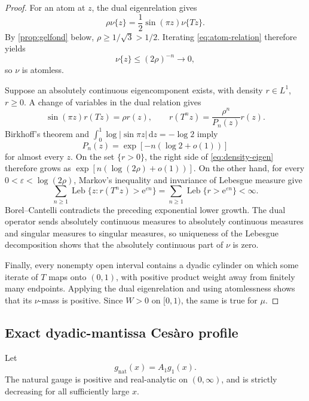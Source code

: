 \documentclass[11pt,oneside]{article}
\theoremstyle{definition}
\theoremstyle{remark}
\newcommand{\e}{\mathrm e}
\newcommand{\dd}{\,\mathrm d}
\newcommand{\T}{T}
\begin{document}
\begin{proof}
For an atom at \(z\), the dual eigenrelation gives
\begin{equation}
 \rho\nu\{z\}=\frac12\sin(\pi z)\nu\{\T z\}.
 \label{eq:atom-relation}
\end{equation}
By \cref{prop:gelfond} below,
\(\rho\ge1/\sqrt3>1/2\).  Iterating
\eqref{eq:atom-relation} therefore yields
\[
 \nu\{z\}\le(2\rho)^{-n}\longrightarrow0,
\]
so \(\nu\) is atomless.

Suppose an absolutely continuous eigencomponent exists, with density
\(r\in L^1\), \(r\ge0\).  A change of variables in the dual relation gives
\begin{equation}
 \sin(\pi z)r(\T z)=\rho r(z),
 \qquad
 r(\T^nz)=\frac{\rho^n}{P_n(z)}r(z).
 \label{eq:density-eigen}
\end{equation}
Birkhoff's theorem and
\(\int_0^1\log|\sin\pi z|\dd z=-\log2\) imply
\[
 P_n(z)=\exp[-n(\log2+o(1))]
\]
for almost every \(z\).  On the set \(\{r>0\}\), the right side of
\eqref{eq:density-eigen} therefore grows as
\(\exp[n(\log(2\rho)+o(1))]\).  On the other hand, for every
\(0<\varepsilon<\log(2\rho)\), Markov's inequality and invariance of
Lebesgue measure give
\[
 \sum_{n\ge1}\operatorname{Leb}\{z:r(\T^nz)>\e^{\varepsilon n}\}
 =\sum_{n\ge1}\operatorname{Leb}\{r>\e^{\varepsilon n}\}<\infty.
\]
Borel--Cantelli contradicts the preceding exponential lower growth.  The
dual operator sends absolutely continuous measures to absolutely continuous
measures and singular measures to singular measures, so uniqueness of the
Lebesgue decomposition shows that the absolutely continuous part of \(\nu\)
is zero.

Finally, every nonempty open interval contains a dyadic cylinder on which some
iterate of \(\T\) maps onto \((0,1)\), with positive product weight away from
finitely many endpoints.  Applying the dual eigenrelation and using
atomlessness shows that its \(\nu\)-mass is positive.  Since \(W>0\) on
\([0,1)\), the same is true for \(\mu\).
\end{proof}

\subsection{Exact dyadic-mantissa Ces\`aro profile}

Let
\begin{equation}
 g_{\mathrm{nat}}(x)=A_1g_1(x).
 \label{eq:gnat}
\end{equation}
The natural gauge is positive and real-analytic on \((0,\infty)\), and is
strictly decreasing for all sufficiently large \(x\).
\end{document}
